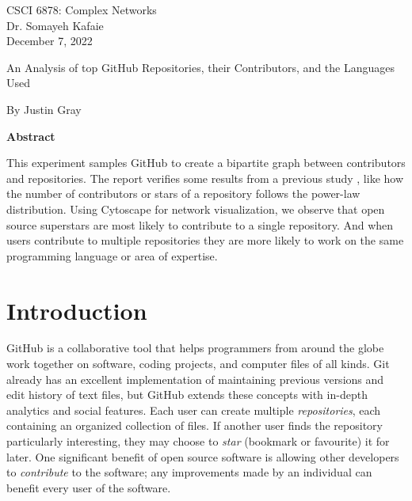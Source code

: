 \documentclass[11pt]{article}
\date{}
\title{\mytitle}
\author{Justin Gray (A00426753)\\justin.gray1@smu.ca}
\newcommand{\mytitle}{An Analysis of top GitHub Repositories, their Contributors, and the Languages Used}
\begin{document}
\maketitle
\begin{center}
  CSCI 6878: Complex Networks \\
  Dr. Somayeh Kafaie \\
  \vspace{24em}
  December 7, 2022
\end{center}
\newpage

\begin{center}
  \Large{\mytitle}
  \vspace{1.5em}
    
  By Justin Gray
  \vspace{1.5em}
  
  \textbf{Abstract}
\end{center}

This experiment samples GitHub to create a bipartite graph between contributors and repositories. The report verifies some results from a previous study \cite{paper}, like how the number of contributors or stars of a repository follows the power-law distribution. Using Cytoscape for network visualization, we observe that open source superstars are most likely to contribute to a single repository. And when users contribute to multiple repositories they are more likely to work on the same programming language or area of expertise.


\tableofcontents
\newpage

\section{Introduction}
\label{sec:introduction}
GitHub is a collaborative tool that helps programmers from around the globe work together on software, coding projects, and computer files of all kinds. Git already has an excellent implementation of maintaining previous versions and edit history of text files, but GitHub extends these concepts with in-depth analytics and social features. Each user can create multiple \emph{repositories}, each containing an organized collection of files. If another user finds the repository particularly interesting, they may choose to \emph{star} (bookmark or favourite) it for later. One significant benefit of open source software is allowing other developers to \emph{contribute} to the software; any improvements made by an individual can benefit every user of the software. 
\end{document}
